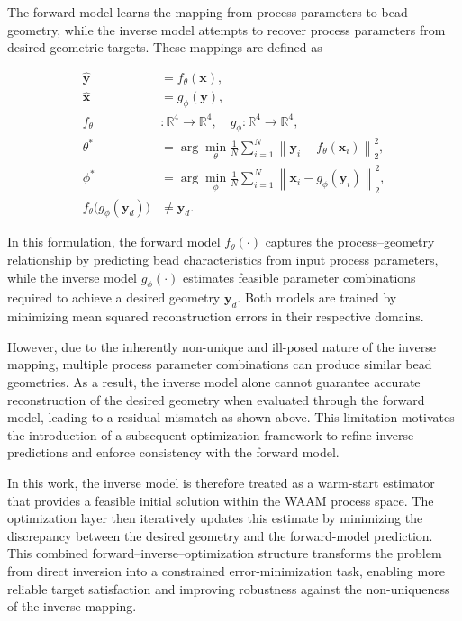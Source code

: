\documentclass[11pt]{article}
\begin{document}
The forward model learns the mapping from process parameters to bead geometry, while the inverse model attempts to recover process parameters from desired geometric targets. These mappings are defined as

\begin{tcolorbox}[colback=white,colframe=black,boxrule=0.5pt,arc=2pt]
\begin{equation}
\begin{aligned}
\hat{\mathbf{y}} &= f_{\theta}(\mathbf{x}), \\
\hat{\mathbf{x}} &= g_{\phi}(\mathbf{y}), \\
f_{\theta} &: \mathbb{R}^{4} \rightarrow \mathbb{R}^{4}, \quad
g_{\phi} : \mathbb{R}^{4} \rightarrow \mathbb{R}^{4}, \\
\theta^{*} &= \arg\min_{\theta} \frac{1}{N} \sum_{i=1}^{N}
\left\| \mathbf{y}_i - f_{\theta}(\mathbf{x}_i) \right\|_2^2, \\
\phi^{*} &= \arg\min_{\phi} \frac{1}{N} \sum_{i=1}^{N}
\left\| \mathbf{x}_i - g_{\phi}(\mathbf{y}_i) \right\|_2^2, \\
f_{\theta}\big(g_{\phi}(\mathbf{y}_d)\big) &\neq \mathbf{y}_d.
\end{aligned}
\end{equation}
\end{tcolorbox}

In this formulation, the forward model $f_{\theta}(\cdot)$ captures the process--geometry relationship by predicting bead characteristics from input process parameters, while the inverse model $g_{\phi}(\cdot)$ estimates feasible parameter combinations required to achieve a desired geometry $\mathbf{y}_d$. Both models are trained by minimizing mean squared reconstruction errors in their respective domains. 


However, due to the inherently non-unique and ill-posed nature of the inverse mapping, multiple process parameter combinations can produce similar bead geometries. As a result, the inverse model alone cannot guarantee accurate reconstruction of the desired geometry when evaluated through the forward model, leading to a residual mismatch as shown above. This limitation motivates the introduction of a subsequent optimization framework to refine inverse predictions and enforce consistency with the forward model.

In this work, the inverse model is therefore treated as a warm-start estimator that provides a feasible initial solution within the WAAM process space. The optimization layer then iteratively updates this estimate by minimizing the discrepancy between the desired geometry and the forward-model prediction. This combined forward–inverse–optimization structure transforms the problem from direct inversion into a constrained error-minimization task, enabling more reliable target satisfaction and improving robustness against the non-uniqueness of the inverse mapping.
\end{document}
